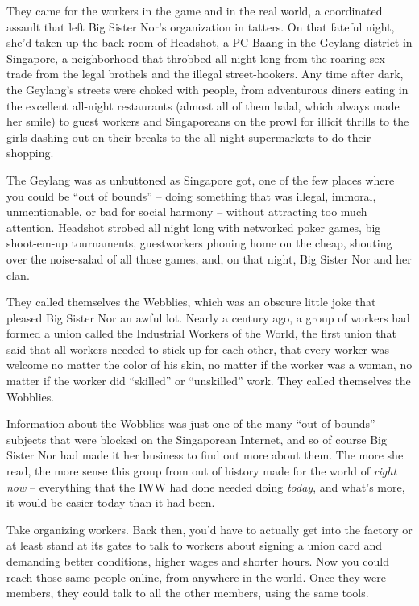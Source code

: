 They came for the workers in the game and in the real world, a
coordinated assault that left Big Sister Nor's organization in
tatters.
On that fateful night, she'd taken up the back room of Headshot, a
PC Baang in the Geylang district in Singapore, a neighborhood that
throbbed all night long from the roaring sex-trade from the legal
brothels and the illegal street-hookers. Any time after dark, the
Geylang's streets were choked with people, from adventurous diners
eating in the excellent all-night restaurants (almost all of them
halal, which always made her smile) to guest workers and
Singaporeans on the prowl for illicit thrills to the girls dashing
out on their breaks to the all-night supermarkets to do their
shopping.

The Geylang was as unbuttoned as Singapore got, one of the few
places where you could be ``out of bounds'' -- doing something that
was illegal, immoral, unmentionable, or bad for social harmony --
without attracting too much attention. Headshot strobed all night
long with networked poker games, big shoot-em-up tournaments,
guestworkers phoning home on the cheap, shouting over the
noise-salad of all those games, and, on that night, Big Sister Nor
and her clan.

They called themselves the Webblies, which was an obscure little
joke that pleased Big Sister Nor an awful lot. Nearly a century
ago, a group of workers had formed a union called the Industrial
Workers of the World, the first union that said that all workers
needed to stick up for each other, that every worker was welcome no
matter the color of his skin, no matter if the worker was a woman,
no matter if the worker did ``skilled'' or ``unskilled'' work. They
called themselves the Wobblies.

Information about the Wobblies was just one of the many ``out of
bounds'' subjects that were blocked on the Singaporean Internet, and
so of course Big Sister Nor had made it her business to find out
more about them. The more she read, the more sense this group from
out of history made for the world of \emph{right now} -- everything
that the IWW had done needed doing \emph{today}, and what's more,
it would be easier today than it had been.

Take organizing workers. Back then, you'd have to actually get into
the factory or at least stand at its gates to talk to workers about
signing a union card and demanding better conditions, higher wages
and shorter hours. Now you could reach those same people online,
from anywhere in the world. Once they were members, they could talk
to all the other members, using the same tools.

